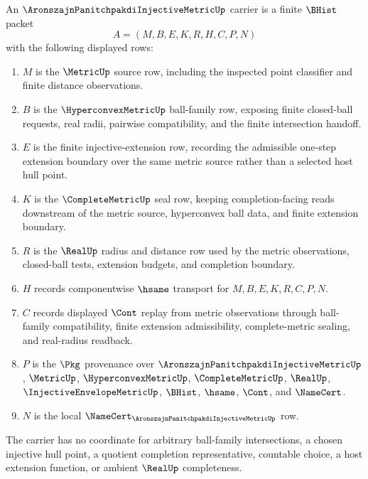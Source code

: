 \begin{definition}
\label{def:aronszajn-panitchpakdi-injective-metric-carrier}
An $\AronszajnPanitchpakdiInjectiveMetricUp$ carrier is a finite $\BHist$ packet
$$
A=(M,B,E,K,R,H,C,P,N)
$$
with the following displayed rows:
\begin{enumerate}
\item $M$ is the $\MetricUp$ source row, including the inspected point classifier and finite distance observations.
\item $B$ is the $\HyperconvexMetricUp$ ball-family row, exposing finite closed-ball requests, real radii, pairwise compatibility, and the finite intersection handoff.
\item $E$ is the finite injective-extension row, recording the admissible one-step extension boundary over the same metric source rather than a selected host hull point.
\item $K$ is the $\CompleteMetricUp$ seal row, keeping completion-facing reads downstream of the metric source, hyperconvex ball data, and finite extension boundary.
\item $R$ is the $\RealUp$ radius and distance row used by the metric observations, closed-ball tests, extension budgets, and completion boundary.
\item $H$ records componentwise $\hsame$ transport for $M,B,E,K,R,C,P,N$.
\item $C$ records displayed $\Cont$ replay from metric observations through ball-family compatibility, finite extension admissibility, complete-metric sealing, and real-radius readback.
\item $P$ is the $\Pkg$ provenance over $\AronszajnPanitchpakdiInjectiveMetricUp$, $\MetricUp$, $\HyperconvexMetricUp$, $\CompleteMetricUp$, $\RealUp$, $\InjectiveEnvelopeMetricUp$, $\BHist$, $\hsame$, $\Cont$, and $\NameCert$.
\item $N$ is the local $\NameCert_{\AronszajnPanitchpakdiInjectiveMetricUp}$ row.
\end{enumerate}
The carrier has no coordinate for arbitrary ball-family intersections, a chosen injective hull point, a quotient completion representative, countable choice, a host extension function, or ambient $\RealUp$ completeness.
\end{definition}


